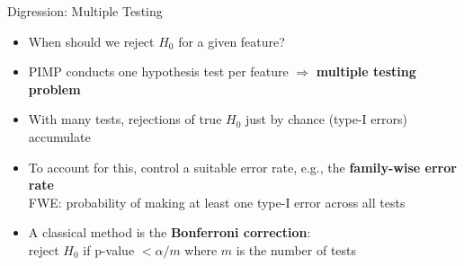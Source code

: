 \documentclass[11pt,compress,t,notes=noshow, aspectratio=169, xcolor=table]{beamer}
\begin{document}


\begin{frame}{Digression: Multiple Testing }

\begin{itemize}%
  \item When should we reject $H_0$ for a given feature?
  \item PIMP conducts one hypothesis test per feature $\Rightarrow$ \textbf{multiple testing problem}
  \item With many tests, rejections of true $H_0$ just by chance (type-I errors) accumulate
  \item To account for this, control a suitable error rate, e.g., the \textbf{family-wise error rate}\\
  FWE: probability of making at least one type-I error across all tests
  \item A classical method is the \textbf{Bonferroni correction}:\\
  reject $H_0$ if p-value $< \alpha/m$ 
  where $m$ is the number of tests
\end{itemize}

\end{frame}


\endlecture
\end{document}
